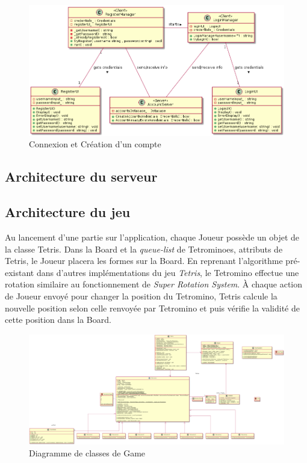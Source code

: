 \documentclass{article}
\begin{document}
\begin{figure}[!h]
    \centering
    \includegraphics[width=1\textwidth]{uml/class/connexion/Connexion.png}
    \caption{Connexion et Création d'un compte}
    \label{fig:Royal-Competition}
\end{figure}

\subsection{Architecture du serveur}

\subsection{Architecture du jeu}

Au lancement d'une partie sur l'application, chaque Joueur possède un objet de la classe Tetris. Dans la Board et la \textit{queue-list} de Tetrominoes, attributs de Tetris, le Joueur placera les formes sur la Board. En reprenant l'algorithme pré-existant dans d'autres implémentations du jeu \textit{Tetris}, le Tetromino effectue une rotation similaire au fonctionnement de \textit{Super Rotation System}. À chaque action de Joueur envoyé pour changer la position du Tetromino, Tetris calcule la nouvelle position selon celle renvoyée par Tetromino et puis vérifie la validité de cette position dans la Board. 

\newpage

\begin{figure}[!h]
	\centering
	 \includegraphics[scale=0.2, angle=90]{uml/class/game/Game.png}
	 \caption{Diagramme de classes de Game}
	 \label{fig:main-menu}
\end{figure}
\end{document}
